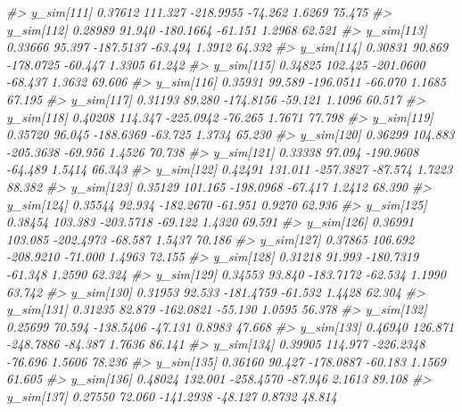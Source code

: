 \documentclass[
  10pt,
  italian,
  a4paper,
  extrafontsizes,onecolumn,openright
  ]{memoir}
\newenvironment{Shaded}{\begin{snugshade}}{\end{snugshade}}
\newcommand{\CommentTok}[1]{\textcolor[rgb]{0.56,0.35,0.01}{\textit{#1}}}
\begin{document}
\begin{Shaded}
\begin{Highlighting}[]
\CommentTok{\#\textgreater{}   y\_sim[111]  0.37612 111.327 {-}218.9955 {-}74.262  1.6269 75.475}
\CommentTok{\#\textgreater{}   y\_sim[112]  0.28989  91.940 {-}180.1664 {-}61.151  1.2968 62.521}
\CommentTok{\#\textgreater{}   y\_sim[113]  0.33666  95.397 {-}187.5137 {-}63.494  1.3912 64.332}
\CommentTok{\#\textgreater{}   y\_sim[114]  0.30831  90.869 {-}178.0725 {-}60.447  1.3305 61.242}
\CommentTok{\#\textgreater{}   y\_sim[115]  0.34825 102.425 {-}201.0600 {-}68.437  1.3632 69.606}
\CommentTok{\#\textgreater{}   y\_sim[116]  0.35931  99.589 {-}196.0511 {-}66.070  1.1685 67.195}
\CommentTok{\#\textgreater{}   y\_sim[117]  0.31193  89.280 {-}174.8156 {-}59.121  1.1096 60.517}
\CommentTok{\#\textgreater{}   y\_sim[118]  0.40208 114.347 {-}225.0942 {-}76.265  1.7671 77.798}
\CommentTok{\#\textgreater{}   y\_sim[119]  0.35720  96.045 {-}188.6369 {-}63.725  1.3734 65.230}
\CommentTok{\#\textgreater{}   y\_sim[120]  0.36299 104.883 {-}205.3638 {-}69.956  1.4526 70.738}
\CommentTok{\#\textgreater{}   y\_sim[121]  0.33338  97.094 {-}190.9608 {-}64.489  1.5414 66.343}
\CommentTok{\#\textgreater{}   y\_sim[122]  0.42491 131.011 {-}257.3827 {-}87.574  1.7223 88.382}
\CommentTok{\#\textgreater{}   y\_sim[123]  0.35129 101.165 {-}198.0968 {-}67.417  1.2412 68.390}
\CommentTok{\#\textgreater{}   y\_sim[124]  0.35544  92.934 {-}182.2670 {-}61.951  0.9270 62.936}
\CommentTok{\#\textgreater{}   y\_sim[125]  0.38454 103.383 {-}203.5718 {-}69.122  1.4320 69.591}
\CommentTok{\#\textgreater{}   y\_sim[126]  0.36991 103.085 {-}202.4973 {-}68.587  1.5437 70.186}
\CommentTok{\#\textgreater{}   y\_sim[127]  0.37865 106.692 {-}208.9210 {-}71.000  1.4963 72.155}
\CommentTok{\#\textgreater{}   y\_sim[128]  0.31218  91.993 {-}180.7319 {-}61.348  1.2590 62.324}
\CommentTok{\#\textgreater{}   y\_sim[129]  0.34553  93.840 {-}183.7172 {-}62.534  1.1990 63.742}
\CommentTok{\#\textgreater{}   y\_sim[130]  0.31953  92.533 {-}181.4759 {-}61.532  1.4428 62.304}
\CommentTok{\#\textgreater{}   y\_sim[131]  0.31235  82.879 {-}162.0821 {-}55.130  1.0595 56.378}
\CommentTok{\#\textgreater{}   y\_sim[132]  0.25699  70.594 {-}138.5406 {-}47.131  0.8983 47.668}
\CommentTok{\#\textgreater{}   y\_sim[133]  0.46940 126.871 {-}248.7886 {-}84.387  1.7636 86.141}
\CommentTok{\#\textgreater{}   y\_sim[134]  0.39905 114.977 {-}226.2348 {-}76.696  1.5606 78.236}
\CommentTok{\#\textgreater{}   y\_sim[135]  0.36160  90.427 {-}178.0887 {-}60.183  1.1569 61.605}
\CommentTok{\#\textgreater{}   y\_sim[136]  0.48024 132.001 {-}258.4570 {-}87.946  2.1613 89.108}
\CommentTok{\#\textgreater{}   y\_sim[137]  0.27550  72.060 {-}141.2938 {-}48.127  0.8732 48.814}

\end{Highlighting}
\end{Shaded}
\end{document}
